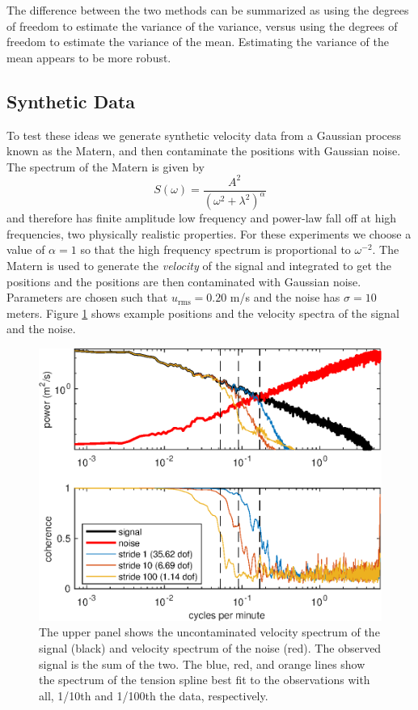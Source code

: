 \documentclass[10pt,journal]{IEEEtran}
\begin{document}
The difference between the two methods can be summarized as using the degrees of freedom to estimate the variance of the variance, versus using the degrees of freedom to estimate the variance of the mean. Estimating the variance of the mean appears to be more robust.

\subsection{Synthetic Data}
\label{sec:synthetic_data}

To test these ideas we generate synthetic velocity data from a Gaussian process known as the Matern, and then contaminate the positions with Gaussian noise. The spectrum of the Matern is given by
\begin{equation}
S(\omega) = \frac{A^2}{(\omega^2 + \lambda^2)^\alpha}
\end{equation}
and therefore has finite amplitude low frequency and power-law fall off at high frequencies, two physically realistic properties. For these experiments we choose a value of $\alpha=1$ so that the high frequency spectrum is proportional to $\omega^{-2}$. The Matern is used to generate the \emph{velocity} of the signal and integrated to get the positions and the positions are then contaminated with Gaussian noise. Parameters are chosen such that $u_{\textrm{rms}}=0.20$ m/s and the noise has $\sigma=10$ meters. Figure \ref{synthetic_process_and_spectrum} shows example positions and the velocity spectra of the signal and the noise.

\begin{figure}[t]
  \centerline{\includegraphics[width=33pc,angle=0]{figures/synthetic_process_and_spectrum_slope2degree3}}
  
  \caption{The upper panel shows the uncontaminated velocity spectrum of the signal (black) and velocity spectrum of the noise (red). The observed signal is the sum of the two. The blue, red, and orange lines show the spectrum of the tension spline best fit to the observations with all, 1/10th and 1/100th the data, respectively. }
  \label{synthetic_process_and_spectrum}
\end{figure}
\end{document}
